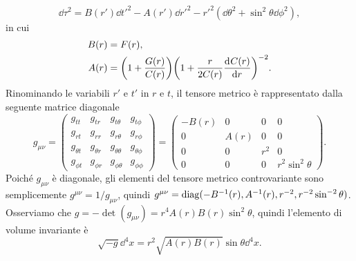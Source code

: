 \begin{equation}
  \label{eq:metrica-standard}
  \dd\tau^{2} = B(r')\dd t'^{2} - A(r')\dd r'^{2} - r'^{2}(\dd\theta^{2} +
  \sin^{2}\theta \dd\phi^{2}),
\end{equation}
in cui
\begin{subequations}
  \begin{align}
    B(r) &= F(r), \\
    A(r) &= \bigg(1 + \frac{G(r)}{C(r)} \bigg) \bigg( 1 + \frac{r}{2C(r)}
    \frac{{\mathop{}\!\mathrm{d}^{}}C(r)}{\mathop{}\!\mathrm{d} {r}^{}} \bigg)^{-2}.
  \end{align}
\end{subequations}
Rinominando le variabili $r'$ e $t'$ in $r$ e $t$, il tensore metrico è
rappresentato dalla seguente matrice diagonale
\begin{equation}
  g_{\mu\nu} =
  \begin{pmatrix}
    g_{tt}       & g_{tr}       & g_{t\theta}      & g_{t\phi}      \\
    g_{rt}       & g_{rr}       & g_{r\theta}      & g_{r\phi}      \\
    g_{\theta t} & g_{\theta r} & g_{\theta\theta} & g_{\theta\phi} \\
    g_{\phi t}   & g_{\phi r}   & g_{\phi\theta}   & g_{\phi\phi}
  \end{pmatrix}
  =
  \begin{pmatrix}
    -B(r) & 0    & 0     & 0 \\
    0     & A(r) & 0     & 0 \\
    0     & 0    & r^{2} & 0 \\
    0     & 0    & 0     & r^{2}\sin^{2}\theta
  \end{pmatrix}.
\end{equation}
Poiché $g_{\mu\nu}$ è diagonale, gli elementi del tensore metrico controvariante
sono semplicemente $g^{\mu\nu} = 1/g_{\mu\nu}$, quindi
$g^{\mu\nu} = \operatorname{diag}(-B^{-1}(r), A^{-1}(r), r^{-2}, r^{-2}\sin^{-2}\theta)$.
Osserviamo che $g = -\det(g_{\mu\nu}) = r^{4}A(r)B(r)\sin^{2}\theta$, quindi
l'elemento di volume invariante è
\begin{equation}
  \sqrt{-g} \dd^{4} x = r^{2}\sqrt{A(r) B(r)} \sin\theta \dd^{4} x.
\end{equation}

